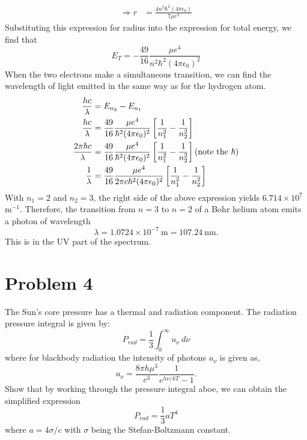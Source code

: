 \documentclass[12pt]{article}
\begin{document}
\begin{adjustwidth}{2.5em}{0pt}
\begin{siderules}
{\begin{equation}
\begin{aligned}
\Rightarrow r &= \frac{4n^2\hbar^2(4\pi \epsilon_0)}{7\mu e^2}
\end{aligned}
\end{equation}
Substituting this expression for radius into the expression for total energy, we find that
\begin{equation}
E_T = -\frac{49}{16}\frac{\mu e^4}{n^2\hbar^2(4\pi\epsilon_0)^2}
\end{equation}
When the two electrons make a simultaneous transition, we can find the wavelength of light emitted in the same way as for the hydrogen atom.
\begin{equation}
\begin{aligned}
\frac{hc}{\lambda} &= E_{n_2} - E_{n_1} \\
\frac{hc}{\lambda} &= \frac{49}{16}\frac{\mu e^4}{\hbar^2(4\pi\epsilon_0)^2}\left[ \frac{1}{n_1^2} - \frac{1}{n_2^2} \right] \\
\frac{2\pi \hbar c}{\lambda} &= \frac{49}{16}\frac{\mu e^4}{\hbar^2(4\pi\epsilon_0)^2}\left[ \frac{1}{n_1^2} - \frac{1}{n_2^2} \right] \hfill (\text{note the } \hbar) \\
\frac{1}{\lambda} &= \frac{49}{16}\frac{\mu e^4}{2\pi c \hbar^2(4\pi\epsilon_0)^2}\left[ \frac{1}{n_1^2} - \frac{1}{n_2^2} \right]
\end{aligned}
\end{equation}
With $n_1 = 2$ and $n_2 = 3$, the right side of the above expression yields $6.714 \times 10^7$ m$^{-1}$. Therefore, the transition from $n = 3$ to $n = 2$ of a Bohr helium atom emits a photon of wavelength
\begin{equation}
\lambda = 1.0724 \times 10^{-7} ~\text{m} = 107.24 ~\text{nm}.
\end{equation}
This is in the UV part of the spectrum.
 }
\end{siderules}
\end{adjustwidth}

\section*{Problem 4}
The Sun's core pressure has a thermal and radiation component. The radiation pressure integral is given by:
\begin{equation*}
P_{rad} = \frac{1}{3} \int_{0}^{\infty} u_{\nu} ~d\nu
\end{equation*}
where for blackbody radiation the intensity of photons $u_{\nu}$ is given as,
\begin{equation*}
u_{\nu} = \frac{8\pi h\mu^3}{c^3}\frac{1}{e^{h\nu /kT}-1}.
\end{equation*}
Show that by working through the pressure integral aboe, we can obtain the simplified expression 
\begin{equation*}
P_{rad} = \frac{1}{3}aT^4
\end{equation*}
where $a = 4\sigma/c$ with $\sigma$ being the Stefan-Boltzmann constant.
\end{document}
